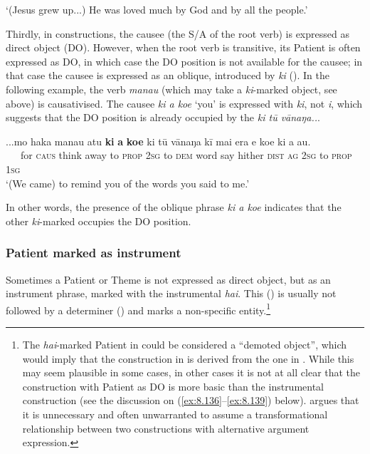 \glt
‘(Jesus grew up...) He was loved much by God and by all the people.’ \textstyleExampleref{[Luke 2:52]}
\z

Thirdly, in  constructions, the causee (the S/A of the root verb) is expressed as direct object (DO). However, when the root verb is transitive, its Patient is often expressed as DO, in which case the DO position is not available for the causee; in that case the causee is expressed as an oblique, introduced by \textit{ki} (). In the following example, the verb \textit{mana{\ꞌ}u} (which may take a \textit{ki}{}-marked object, see  above) is causativised. The causee \textit{ki a koe} ‘you’ is expressed with \textit{ki}, not \textit{i}, which suggests that the DO position is already occupied by the  \textit{ki tū vānaŋa..}. 

\ea\label{ex:8.129}
\gll ...mo haka mana{\ꞌ}u atu \textbf{ki} \textbf{a} \textbf{koe} ki tū vānaŋa kī mai era e koe ki a au.\\
~~~for \textsc{caus} think away to \textsc{prop} \textsc{2sg} to \textsc{dem} word say hither \textsc{dist} \textsc{ag} \textsc{2sg} to \textsc{prop} \textsc{1sg}\\
\glt
‘(We came) to remind you of the words you said to me.’ \textstyleExampleref{[R229.207]}  
\z

In other words, the presence of the oblique phrase \textit{ki a koe} indicates that the other \textit{ki}{}-marked  occupies the DO position.
\subsubsection[Patient marked as instrument]{Patient marked as instrument}\label{sec:8.6.4.3}
Sometimes a Patient or Theme is not expressed as direct object, but as an instrument phrase, marked with the instrumental  \textit{hai}. This  () is usually not followed by a determiner () and marks a non-specific entity.\footnote{\label{fn:438}The \textit{hai}{}-marked Patient in  could be considered a “demoted object”, which would imply that the construction in  is derived from the one in . While this may seem plausible in some cases, in other cases it is not at all clear that the construction with Patient as DO is more basic than the instrumental construction (see the discussion on (\ref{ex:8.136}–\ref{ex:8.139}) below). \citet{Goldberg1995} argues that it is unnecessary and often unwarranted to assume a transformational relationship between two constructions with alternative argument expression.} 

